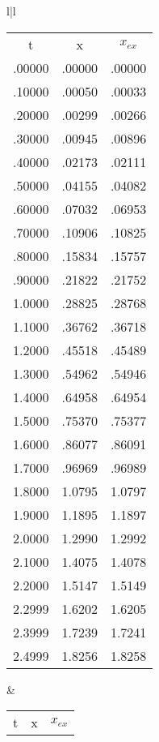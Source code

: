 \begin{figure}
    \centering
    \begin{tabular}{l|l}
        \begin{tabular}{ccc}
            \multicolumn{1}{c}{t} &  \multicolumn{1}{c}{x}  & \multicolumn{1}{c}{$x_{ex}$}\\
            .00000 & .00000 & .00000 \\
            .10000 & .00050 & .00033 \\
            .20000 & .00299 & .00266 \\
            .30000 & .00945 & .00896 \\
            .40000 & .02173 & .02111 \\
            .50000 & .04155 & .04082 \\
            .60000 & .07032 & .06953 \\
            .70000 & .10906 & .10825 \\
            .80000 & .15834 & .15757 \\
            .90000 & .21822 & .21752 \\
            1.0000 & .28825 & .28768 \\
            1.1000 & .36762 & .36718 \\
            1.2000 & .45518 & .45489 \\
            1.3000 & .54962 & .54946 \\
            1.4000 & .64958 & .64954 \\
            1.5000 & .75370 & .75377 \\
            1.6000 & .86077 & .86091 \\
            1.7000 & .96969 & .96989 \\
            1.8000 & 1.0795 & 1.0797 \\
            1.9000 & 1.1895 & 1.1897 \\
            2.0000 & 1.2990 & 1.2992 \\
            2.1000 & 1.4075 & 1.4078 \\
            2.2000 & 1.5147 & 1.5149 \\
            2.2999 & 1.6202 & 1.6205 \\
            2.3999 & 1.7239 & 1.7241 \\
            2.4999 & 1.8256 & 1.8258 \\
        \end{tabular}
        &
        \begin{tabular}{ccc}
            \multicolumn{1}{c}{t} &  \multicolumn{1}{c}{x}  & \multicolumn{1}{c}{$x_{ex}$}\\

\end{tabular}
\end{tabular}
\end{figure}
